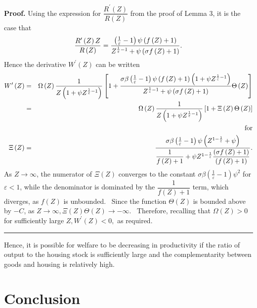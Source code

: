 \documentclass{article}
\newenvironment{proof}[1][Proof]{\noindent\textbf{#1.} }{\ \rule{0.5em}{0.5em}}
\begin{document}
\begin{doublespace}
\begin{proof}
Using the expression for $\dfrac{R^{\prime }\left( Z\right) }{R\left(
Z\right) }$ from the proof of Lemma 3, it is the case that%
\begin{equation*}
\frac{R^{\prime }\left( Z\right) Z}{R\left( Z\right) }=\frac{\left( \frac{1}{%
\varepsilon }-1\right) \psi \left( f\left( Z\right) +1\right) }{Z^{\frac{1}{%
\varepsilon }-1}+\psi \left( \sigma f\left( Z\right) +1\right) }.
\end{equation*}%
Hence the derivative $W^{\prime }\left( Z\right) $ can be written 
\begin{eqnarray*}
W^{\prime }\left( Z\right) &=&\Omega \left( Z\right) \frac{1}{Z\left( 1+\psi
Z^{\frac{1}{\varepsilon }-1}\right) }\left[ 1+\frac{\sigma \beta \left( 
\frac{1}{\varepsilon }-1\right) \psi \left( f\left( Z\right) +1\right)
\left( 1+\psi Z^{\frac{1}{\varepsilon }-1}\right) }{Z^{\frac{1}{\varepsilon }%
-1}+\psi \left( \sigma f\left( Z\right) +1\right) }\Theta \left( Z\right) %
\right] \\
&=&\Omega \left( Z\right) \frac{1}{Z\left( 1+\psi Z^{\frac{1}{\varepsilon }%
-1}\right) }\left[ 1+\Xi \left( Z\right) \Theta \left( Z\right) \right] \\
&&\text{for} \\
\Xi \left( Z\right) &=&\frac{\sigma \beta \left( \frac{1}{\varepsilon }%
-1\right) \psi \left( Z^{1-\frac{1}{\varepsilon }}+\psi \right) }{\dfrac{1}{%
f\left( Z\right) +1}+\psi Z^{1-\frac{1}{\varepsilon }}\dfrac{\left( \sigma
f\left( Z\right) +1\right) }{\left( f\left( Z\right) +1\right) }}.
\end{eqnarray*}%
As $Z\rightarrow \infty $, the numerator of $\Xi \left( Z\right) $ converges
to the constant $\sigma \beta \left( \frac{1}{\varepsilon }-1\right) \psi
^{2}$ for $\varepsilon <1$, while the denominator is dominated by the $%
\dfrac{1}{f\left( Z\right) +1}$ term, which diverges, as $f\left( Z\right) $
is unbounded. \ Since the function $\Theta \left( Z\right) $ is bounded
above by $-C$, as $Z\rightarrow \infty ,\Xi \left( Z\right) \Theta \left(
Z\right) \rightarrow -\infty $. \ Therefore, recalling that $\Omega \left(
Z\right) >0$ for sufficiently large $Z,W^{\prime }\left( Z\right) <0,$ as
required.
\end{proof}

Hence, it is possible for welfare to be decreasing in productivity if the
ratio of output to the housing stock is sufficiently large and the
complementarity between goods and housing is relatively high.

\section{Conclusion}


\end{doublespace}
\end{document}
